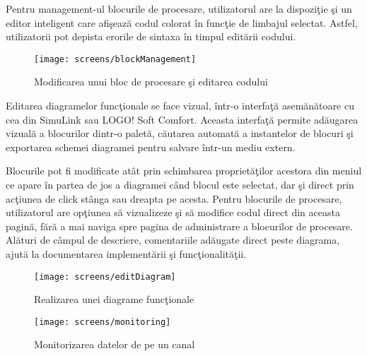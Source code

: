 Pentru management-ul blocurile de procesare, utilizatorul are la dispoziţie şi un editor inteligent care afişează codul colorat în funcţie de limbajul selectat. Astfel, utilizatorii pot depista erorile de sintaxa în timpul editării codului.
\begin{figure}[H]
	\centering
	\texttt{[image: screens/blockManagement]}
	\captionsetup{justification=centering}
	\caption{Modificarea unui bloc de procesare şi editarea codului}
	\label{fig:blockManagement}
\end{figure}
Editarea diagramelor funcţionale se face vizual, într-o interfaţă asemănătoare cu cea din SimuLink sau LOGO! Soft Comfort. Aceasta interfaţă permite adăugarea vizuală a blocurilor dintr-o paletă, căutarea automată a instantelor de blocuri şi exportarea schemei diagramei pentru salvare într-un mediu extern. 

Blocurile pot fi modificate atât prin schimbarea proprietăţilor acestora din meniul ce apare în partea de jos a diagramei când blocul este selectat, dar şi direct prin acţiunea de click stânga sau dreapta pe acesta. Pentru blocurile de procesare, utilizatorul are opţiunea să vizualizeze şi să modifice codul direct din aceasta pagină, fără a mai naviga spre pagina de administrare a blocurilor de procesare.
Alături de câmpul de descriere, comentariile adăugate direct peste diagrama, ajută la documentarea implementării şi funcţionalităţii.
\begin{figure}[H]
	\centering
	\texttt{[image: screens/editDiagram]}
	\captionsetup{justification=centering}
	\caption{Realizarea unei diagrame funcţionale}
	\label{fig:editDiagram}
\end{figure}

\begin{figure}[H]
	\centering
	\texttt{[image: screens/monitoring]}
	\captionsetup{justification=centering}
	\caption{Monitorizarea datelor de pe un canal}
	\label{fig:monitoring}
\end{figure}